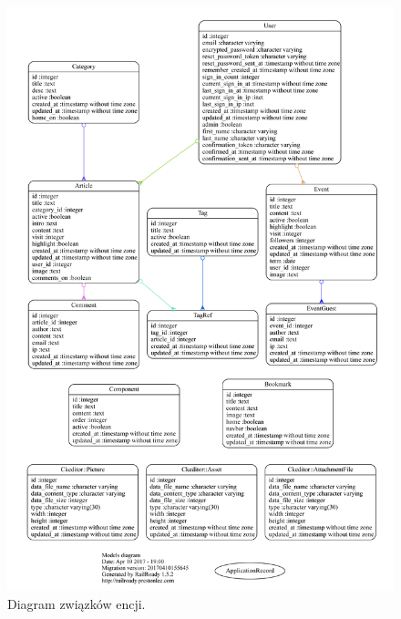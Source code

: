 \documentclass[openright]{xmgr}
\begin{document}
\begin{figure}[!tbh]
\centering
\includegraphics[width=.8\linewidth]{fig/erd2}
\caption{Diagram związków encji.}
\end{figure}
\end{document}
